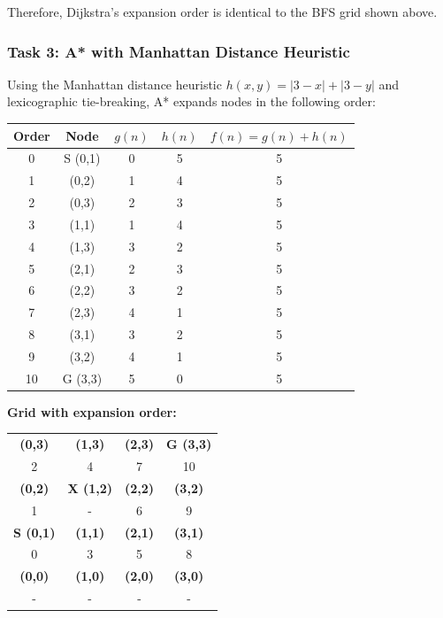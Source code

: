 \documentclass[11pt]{article}
\begin{document}
Therefore, Dijkstra's expansion order is identical to the BFS grid shown above.

\subsubsection{Task 3: A* with Manhattan Distance Heuristic}

Using the Manhattan distance heuristic $h(x,y) = |3-x| + |3-y|$ and lexicographic tie-breaking, A* expands nodes in the following order:

\begin{center}
\begin{tabular}{|c|c|c|c|c|}
\hline
\textbf{Order} & \textbf{Node} & \textbf{$g(n)$} & \textbf{$h(n)$} & \textbf{$f(n) = g(n) + h(n)$} \\
\hline
0 & S (0,1) & 0 & 5 & 5 \\
\hline
1 & (0,2) & 1 & 4 & 5 \\
\hline
2 & (0,3) & 2 & 3 & 5 \\
\hline
3 & (1,1) & 1 & 4 & 5 \\
\hline
4 & (1,3) & 3 & 2 & 5 \\
\hline
5 & (2,1) & 2 & 3 & 5 \\
\hline
6 & (2,2) & 3 & 2 & 5 \\
\hline
7 & (2,3) & 4 & 1 & 5 \\
\hline
8 & (3,1) & 3 & 2 & 5 \\
\hline
9 & (3,2) & 4 & 1 & 5 \\
\hline
10 & G (3,3) & 5 & 0 & 5 \\
\hline
\end{tabular}
\end{center}

\textbf{Grid with expansion order:}

\begin{center}
\begin{tabular}{|c|c|c|c|}
\hline
\textbf{(0,3)} & \textbf{(1,3)} & \textbf{(2,3)} & \textbf{G (3,3)} \\
2 & 4 & 7 & 10 \\
\hline
\textbf{(0,2)} & \textbf{X (1,2)} & \textbf{(2,2)} & \textbf{(3,2)} \\
1 & - & 6 & 9 \\
\hline
\textbf{S (0,1)} & \textbf{(1,1)} & \textbf{(2,1)} & \textbf{(3,1)} \\
0 & 3 & 5 & 8 \\
\hline
\textbf{(0,0)} & \textbf{(1,0)} & \textbf{(2,0)} & \textbf{(3,0)} \\
- & - & - & - \\
\hline
\end{tabular}
\end{center}
\end{document}

